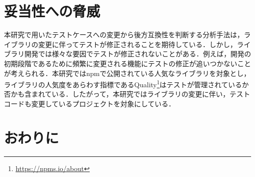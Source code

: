 \documentclass[submit]{ipsj}
\begin{document}
{%
\section{妥当性への脅威}\label{sec:validity}


本研究で用いたテストケースへの変更から後方互換性を判断する分析手法は，ライブラリの変更に伴ってテストが修正されることを期待している．しかし，ライブラリ開発では様々な要因でテストが修正されないことがある．例えば，開発の初期段階であるために頻繁に変更される機能にテストの修正が追いつかないことが考えられる．本研究ではnpmで公開されている人気なライブラリを対象とし，ライブラリの人気度をあらわす指標であるQuality\footnote{\url{https://npms.io/about}}はテストが管理されているか否かも含まれている．したがって，本研究ではライブラリの変更に伴い，テストコードも変更しているプロジェクトを対象にしている．

\section{おわりに}
\label{sec:conclusion}

}
\end{document}
